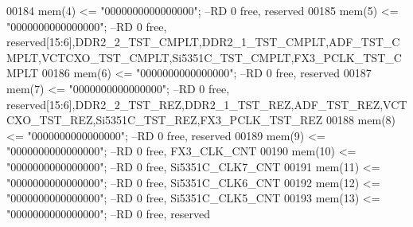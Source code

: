 \begin{DoxyCode}
00184          \textcolor{vhdlchar}{mem}\textcolor{vhdlchar}{(}\textcolor{vhdllogic}{}\textcolor{vhdllogic}{4}\textcolor{vhdlchar}{)}   \textcolor{vhdlchar}{<=} \textcolor{vhdllogic}{"0000000000000000"};\textcolor{keyword}{ --RD   0 free, reserved}
00185          \textcolor{vhdlchar}{mem}\textcolor{vhdlchar}{(}\textcolor{vhdllogic}{}\textcolor{vhdllogic}{5}\textcolor{vhdlchar}{)}   \textcolor{vhdlchar}{<=} \textcolor{vhdllogic}{"0000000000000000"};\textcolor{keyword}{ --RD   0 free,
       reserved[15:6],DDR2\_2\_TST\_CMPLT,DDR2\_1\_TST\_CMPLT,ADF\_TST\_CMPLT,VCTCXO\_TST\_CMPLT,Si5351C\_TST\_CMPLT,FX3\_PCLK\_TST\_CMPLT}
00186          \textcolor{vhdlchar}{mem}\textcolor{vhdlchar}{(}\textcolor{vhdllogic}{}\textcolor{vhdllogic}{6}\textcolor{vhdlchar}{)}   \textcolor{vhdlchar}{<=} \textcolor{vhdllogic}{"0000000000000000"};\textcolor{keyword}{ --RD   0 free, reserved}
00187          \textcolor{vhdlchar}{mem}\textcolor{vhdlchar}{(}\textcolor{vhdllogic}{}\textcolor{vhdllogic}{7}\textcolor{vhdlchar}{)}   \textcolor{vhdlchar}{<=} \textcolor{vhdllogic}{"0000000000000000"};\textcolor{keyword}{ --RD   0 free,
       reserved[15:6],DDR2\_2\_TST\_REZ,DDR2\_1\_TST\_REZ,ADF\_TST\_REZ,VCTCXO\_TST\_REZ,Si5351C\_TST\_REZ,FX3\_PCLK\_TST\_REZ}
00188          \textcolor{vhdlchar}{mem}\textcolor{vhdlchar}{(}\textcolor{vhdllogic}{}\textcolor{vhdllogic}{8}\textcolor{vhdlchar}{)}   \textcolor{vhdlchar}{<=} \textcolor{vhdllogic}{"0000000000000000"};\textcolor{keyword}{ --RD   0 free, reserved}
00189          \textcolor{vhdlchar}{mem}\textcolor{vhdlchar}{(}\textcolor{vhdllogic}{}\textcolor{vhdllogic}{9}\textcolor{vhdlchar}{)}   \textcolor{vhdlchar}{<=} \textcolor{vhdllogic}{"0000000000000000"};\textcolor{keyword}{ --RD   0 free, FX3\_CLK\_CNT  }
00190          \textcolor{vhdlchar}{mem}\textcolor{vhdlchar}{(}\textcolor{vhdllogic}{}\textcolor{vhdllogic}{10}\textcolor{vhdlchar}{)}  \textcolor{vhdlchar}{<=} \textcolor{vhdllogic}{"0000000000000000"};\textcolor{keyword}{ --RD   0 free, Si5351C\_CLK7\_CNT}
00191          \textcolor{vhdlchar}{mem}\textcolor{vhdlchar}{(}\textcolor{vhdllogic}{}\textcolor{vhdllogic}{11}\textcolor{vhdlchar}{)}  \textcolor{vhdlchar}{<=} \textcolor{vhdllogic}{"0000000000000000"};\textcolor{keyword}{ --RD   0 free, Si5351C\_CLK6\_CNT}
00192          \textcolor{vhdlchar}{mem}\textcolor{vhdlchar}{(}\textcolor{vhdllogic}{}\textcolor{vhdllogic}{12}\textcolor{vhdlchar}{)}  \textcolor{vhdlchar}{<=} \textcolor{vhdllogic}{"0000000000000000"};\textcolor{keyword}{ --RD   0 free, Si5351C\_CLK5\_CNT}
00193          \textcolor{vhdlchar}{mem}\textcolor{vhdlchar}{(}\textcolor{vhdllogic}{}\textcolor{vhdllogic}{13}\textcolor{vhdlchar}{)}  \textcolor{vhdlchar}{<=} \textcolor{vhdllogic}{"0000000000000000"};\textcolor{keyword}{ --RD   0 free, reserved}

\end{DoxyCode}
